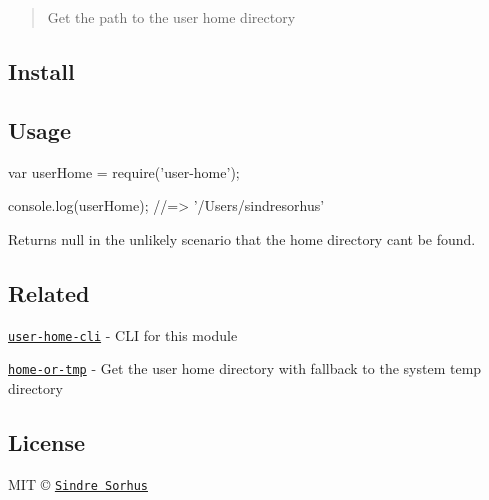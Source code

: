 \begin{quote}
Get the path to the user home directory \end{quote}


\subsection*{Install}




\subsection*{Usage}


\begin{DoxyCode}
var userHome = require('user-home');

console.log(userHome);
//=> '/Users/sindresorhus'
\end{DoxyCode}


Returns {\ttfamily null} in the unlikely scenario that the home directory can\textquotesingle{}t be found.

\subsection*{Related}


\begin{DoxyItemize}
\item \href{https://github.com/sindresorhus/user-home-cli}{\tt user-\/home-\/cli} -\/ C\+LI for this module
\item \href{https://github.com/sindresorhus/home-or-tmp}{\tt home-\/or-\/tmp} -\/ Get the user home directory with fallback to the system temp directory
\end{DoxyItemize}

\subsection*{License}

M\+IT © \href{http://sindresorhus.com}{\tt Sindre Sorhus} 